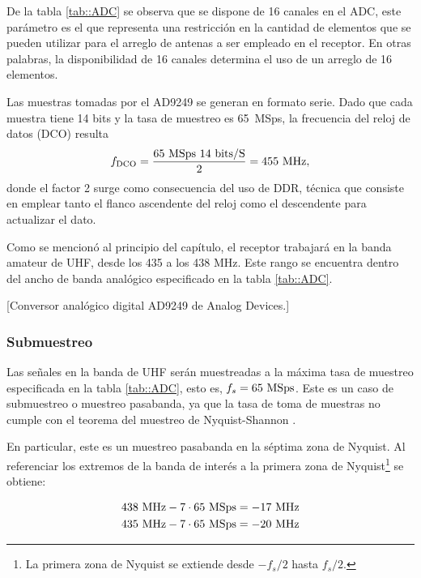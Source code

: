 \documentclass[../../main.tex]{subfiles}
\begin{document}
De la tabla \ref{tab::ADC} se observa que se dispone de 16 canales en el ADC, este parámetro es el que representa una restricción en la cantidad de elementos que se pueden utilizar para el arreglo de antenas a ser empleado en el receptor. En otras palabras, la disponibilidad de 16 canales determina el uso de un arreglo de 16 elementos.

Las muestras tomadas por el AD9249 se generan en formato serie. Dado que cada muestra tiene 14 bits y la tasa de muestreo es 65~MSps, la frecuencia del reloj de datos (DCO) resulta
\begin{equation}
    f_\textrm{DCO} = \frac{65\un{MSps} \ 14\un{bits/S}}{2} = 455\un{MHz},
    \label{eq::DCO}
\end{equation}
donde el factor 2 surge como consecuencia del uso de DDR, técnica que consiste en emplear tanto el flanco ascendente del reloj como el descendente para actualizar el dato.

Como se mencionó al principio del capítulo, el receptor trabajará en la banda amateur de UHF, desde los 435 a los 438 MHz. Este rango se encuentra dentro del ancho de banda analógico especificado en la tabla \ref{tab::ADC}.

[Conversor analógico digital AD9249 de Analog Devices.]

\subsubsection{Submuestreo}
Las señales en la banda de UHF serán muestreadas a la máxima tasa de muestreo especificada en la tabla \ref{tab::ADC}, esto es, $f_s = 65~\textrm{MSps}$. Este es un caso de submuestreo o muestreo pasabanda, ya que la tasa de toma de muestras no cumple con el teorema del muestreo de Nyquist-Shannon \cite{teorema-del-muestreo}.

En particular, este es un muestreo pasabanda en la séptima zona de Nyquist. Al referenciar los extremos de la banda de interés a la primera zona de Nyquist\footnote{La primera zona de Nyquist se extiende desde $-f_s/2$ hasta $f_s/2$.} se obtiene:

\begin{equation}
\!
\begin{aligned}
438~\textrm{MHz} - 7 \cdot 65~\textrm{MSps} = -17~\textrm{MHz} \\
435~\textrm{MHz} - 7 \cdot 65~\textrm{MSps} = -20~\textrm{MHz} 
\end{aligned}
\label{eq::freqs-submuestreadas}
\end{equation}
\end{document}
